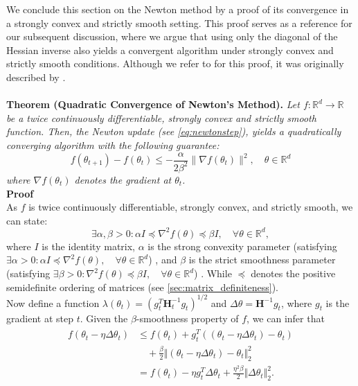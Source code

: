 We conclude this section on the Newton method by a proof of its convergence in a strongly convex and strictly smooth setting.
This proof serves as a reference for our subsequent discussion, where we argue that using only the diagonal of the Hessian inverse also yields
a convergent algorithm under strongly convex and strictly smooth conditions. Although  we refer to \cite{yao2021adahessian} for this proof,
it was originally described by \cite{boyd2004convex}.
\\\\
\noindent\textbf{Theorem (Quadratic Convergence of Newton's Method).} 
\textit{Let $f: \mathbb{R}^d \to \mathbb{R}$ be a twice continuously differentiable, strongly convex and strictly smooth function.
Then, the Newton update (see \ref{eq:newtonstep}),
yields a quadratically converging algorithm with the following guarantee:
\[ f(\theta_{t+1}) - f(\theta_t) \leq - \frac{\alpha}{2\beta^{2}} \|\nabla f(\theta_t)\|^2, \quad \theta  \in \mathbb{R}^d\]
where  $\nabla f(\theta_t)$ denotes the gradient at $\theta_t$.}
\vspace{1em}
\noindent\\\textbf{Proof}\\
As $f$ is twice continuously differentiable, strongly convex, and strictly smooth, we can state:
\begin{equation}
\label{eq:convex_smooth}
\exists \alpha, \beta > 0 : \alpha I \preceq \nabla^2 f(\theta) \preceq \beta I, \quad \forall \theta \in \mathbb{R}^d,
\end{equation}
where $I$ is the identity matrix, $\alpha$ is the strong convexity parameter
(satisfying $\exists \alpha > 0 : \alpha I \preceq \nabla^2 f(\theta), \quad \forall \theta \in \mathbb{R}^d$) \cite{convexity_smoothness},
and $\beta$ is the strict smoothness parameter (satisfying $\exists \beta > 0 : \nabla^2 f(\theta) \preceq \beta I, \quad \forall \theta \in \mathbb{R}^d$) \cite{convexity_smoothness}.
While $\preceq$ denotes the positive semidefinite ordering of matrices (see \ref{sec:matrix_definiteness}).\\
Now define a function $\lambda(\theta_t) = \left( g_t^T \mathbf{H}_t^{-1} g_t \right)^{1/2}$ and $
\Delta \theta = \mathbf{H}^{-1}g_t$, where $g_t$ is the gradient at step $t$.
Given the $\beta$-smoothness property of $f$, we can infer that 
\begin{align}
    \begin{split}
        f(\theta_t - \eta\Delta \theta_t) &\leq f(\theta_t) + g_t^T ((\theta_t - \eta\Delta \theta_t) - \theta_t) \\
        &\quad + \frac{\beta}{2} \Vert (\theta_t - \eta\Delta \theta_t) - \theta_t \Vert_2 ^2\\
        &= f(\theta_t) - \eta g_t^T \Delta \theta_t + \frac{\eta^2\beta}{2} \Vert \Delta \theta_t \Vert_2 ^2.
    \end{split}
\end{align}


